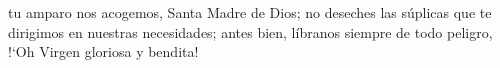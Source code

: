 tu amparo nos acogemos, Santa Madre de Dios; no deseches las súplicas que te dirigimos en nuestras necesidades;
antes bien, líbranos siempre de todo peligro, {!`}Oh Virgen gloriosa y bendita!